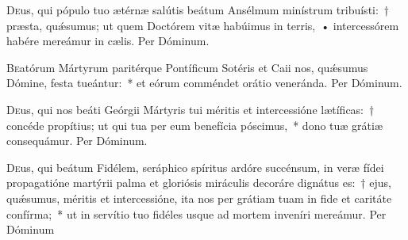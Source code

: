 \documentclass[vesperale_romanum.tex]{subfiles}
\begin{document}
\myrule


\duplex

\odoctoroptime

\oratio

\lettrine{D}{e}us, qui pópulo tuo ætérnæ salútis beátum Ansélmum minístrum tribuísti:~† præsta, quǽsumus; ut quem Do\-ctórem vitæ habúimus in terris,~• intercessórem habére mereámur in cælis. Per Dóminum.

\commsequentis

\myrule


\semiduplex


\oratio

\lettrine{B}{e}atórum Mártyrum paritérque Pontíficum Sotéris et Caii nos, quǽsumus Dómine, festa tueántur:~* et eórum comméndet orátio veneránda. Per Dóminum.

\capitdeseq

\myrule


\semiduplex

\oratio

\lettrine{D}{e}us, qui nos beáti Geórgii Mártyris tui méritis et intercessióne lætíficas:~† concéde propítius; ut qui tua per eum benefícia póscimus,~* dono tuæ grátiæ consequámur.
Per Dóminum.


\vespsequentiscomm

\myrule


\duplex

\oratio

\lettrine{D}{e}us, qui beátum Fidélem, seráphico spíritus ardóre succénsum, in veræ fídei propagatióne martýrii palma et gloriósis miráculis decoráre dignátus es:~† ejus, quǽsumus, méritis et intercessióne, ita nos per grátiam tuam in fide et caritáte confírma;~* ut in servítio tuo fidéles usque ad mortem inveníri mereámur.
Per Dóminum 
\end{document}

